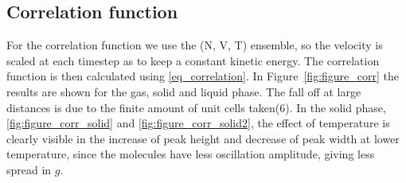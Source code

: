 \documentclass[twoside]{article}
\begin{document}
\subsection{Correlation function}
For the correlation function we use the (N, V, T) ensemble, so the velocity is scaled at each timestep as to keep a constant kinetic energy. The correlation function is then calculated using \eqref{eq_correlation}. In Figure~\ref{fig:figure_corr} the results are shown for the gas, solid and liquid phase. The fall off at large distances is due to the finite amount of unit cells taken(6). In the solid phase, \ref{fig:figure_corr_solid} and \ref{fig:figure_corr_solid2}, the effect of temperature is clearly visible in the increase of peak height and decrease of peak width at lower temperature, since the molecules have less oscillation amplitude, giving less spread in $g$. 
\end{document}
